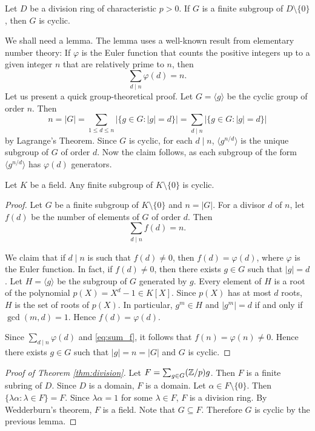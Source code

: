 \begin{theorem}
\label{thm:division}
    Let $D$ be a division ring of characteristic $p>0$. 
    If $G$ is a finite subgroup of $D\setminus\{0\}$, then 
    $G$ is cyclic. 
\end{theorem}

We shall need a lemma. The lemma 
uses a well-known result from elementary number theory:
If $\varphi$ is the Euler function that 
counts the positive integers up to a given integer $n$ 
that are relatively prime to $n$, then 
\[
\sum_{d\mid n}\varphi(d)=n.
\]
Let us present a quick group-theoretical proof. 
Let $G=\langle g\rangle$ be the cyclic group of order $n$.
Then 
\[
n=|G|=\sum_{1\leq d\leq n}|\{g\in G:|g|=d\}|
=\sum_{d\mid n}|\{g\in G:|g|=d\}|
\]
by Lagrange's Theorem. Since $G$ is cyclic, 
for each $d\mid n$, 
$\langle g^{n/d}\rangle$ is the 
unique subgroup of $G$ of order $d$. Now the claim follows, 
as each subgroup
of the form $\langle g^{n/d}\rangle$ has $\varphi(d)$ 
generators. 

\begin{lemma}
    Let $K$ be a field. 
    Any finite subgroup of $K\setminus\{0\}$ is cyclic. 
\end{lemma}

\begin{proof}
    Let $G$ be a finite subgroup of $K\setminus\{0\}$ and
    $n=|G|$. For a divisor $d$ of $n$, let
    $f(d)$ be the number of elements of $G$ of order $d$. 
    Then 
    \begin{equation}
    \label{eq:sum_f}
    \sum_{d\mid n}f(d)=n.
    \end{equation}
    
    We claim that if $d\mid n$ is such that
    $f(d)\ne0$, then $f(d)=\varphi(d)$, where $\varphi$ is
    the Euler function. In fact, if $f(d)\ne 0$, 
    then there exists $g\in G$ such that $|g|=d$. Let 
    $H=\langle g\rangle$ be the subgroup of $G$ generated by $g$.
    Every element of $H$ is a root of the polynomial
    $p(X)=X^d-1\in K[X]$. Since $p(X)$ has at most $d$ roots, 
    $H$ is the set of roots of $p(X)$. In particular, 
    $g^m\in H$ and $|g^m|=d$ if and only if $\gcd(m,d)=1$. Hence
    $f(d)=\varphi(d)$.

    Since $\sum_{d\mid n}\varphi(d)$ and \eqref{eq:sum_f}, 
    it follows that $f(n)=\varphi(n)\ne0$.
    Hence there exists $g\in G$ such that 
    $|g|=n=|G|$ and $G$ is cyclic.
\end{proof}

\begin{proof}[Proof of Theorem \ref{thm:division}]
    Let $F=\sum_{g\in G}(\mathbb{Z}/p)g$. Then $F$ is a finite 
    subring of $D$. Since $D$ is a domain, $F$ is a domain. 
    Let $\alpha\in F\setminus\{0\}$. 
    Then 
    $\{\lambda\alpha:\lambda\in F\}=F$. Since $\lambda\alpha=1$
    for some $\lambda\in F$, $F$ is a division ring. By Wedderburn's 
    theorem, $F$ is a field. Note that $G\subseteq F$. 
    Therefore $G$ is cyclic by the previous lemma. 
\end{proof}

